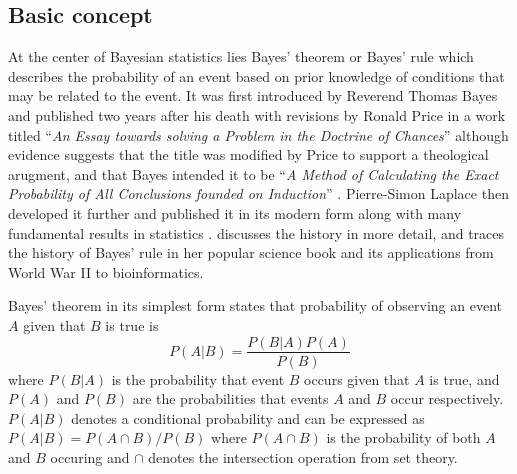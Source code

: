 
\subsection{Basic concept}
At the center of Bayesian statistics lies Bayes' theorem or Bayes' rule which describes the probability of an event based on prior knowledge of conditions that may be related to the event. It was first introduced by Reverend Thomas Bayes and published two years after his death with revisions by Ronald Price in a work titled ``\textit{An Essay towards solving a Problem in the Doctrine of Chances}'' \citep{Bayes1763} although evidence suggests that the title was modified by Price to support a theological arugment, and that Bayes intended it to be ``\textit{A Method of Calculating the Exact Probability of All Conclusions founded on Induction}'' \citep{Stigler13}. Pierre-Simon Laplace then developed it further and published it in its modern form along with many fundamental results in statistics \citep{Laplace1820}. \citet{Dale99} discusses the history in more detail, and \citet{McGrayne11} traces the history of Bayes' rule in her popular science book and its applications from World War II to bioinformatics.

Bayes' theorem in its simplest form states that probability of observing an event $A$ given that $B$ is true is
\begin{equation} \label{eq:BayesRule}
  P(A|B) = \frac{P(B|A) P(A)}{P(B)}
\end{equation}
where $P(B|A)$ is the probability that event $B$ occurs given that $A$ is true, and $P(A)$ and $P(B)$ are the probabilities that events $A$ and $B$ occur respectively. $P(A|B)$ denotes a conditional probability and can be expressed as $P(A|B) = P(A \cap B) / P(B)$ where $P(A \cap B)$ is the probability of both $A$ and $B$ occuring and $\cap$ denotes the intersection operation from set theory.\footnotemark~

